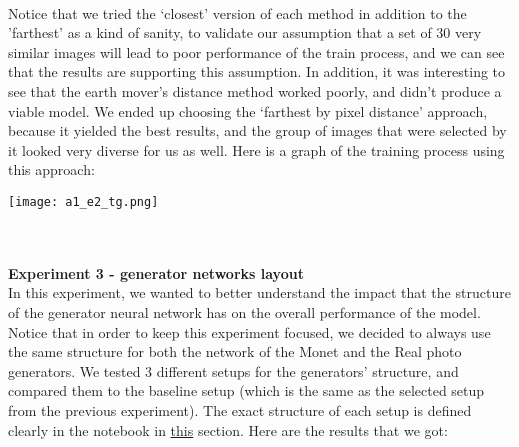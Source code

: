 \documentclass{article}
\begin{document}
\begin{table}[!ht]
    \centering
\end{table}
\\
Notice that we tried the ‘closest’ version of each method in addition to the ’farthest’ as a kind of sanity, to validate our assumption that a set of 30 very similar images will lead to poor performance of the train process, and we can see that the results are supporting this assumption. In addition, it was interesting to see that the earth mover’s distance method worked poorly, and didn’t produce a viable model.
We ended up choosing the ‘farthest by pixel distance’ approach, because it yielded the best results, and the group of images that were selected by it looked very diverse for us as well. Here is a graph of the training process using this approach:

\begin{center}
    \texttt{[image: a1\_e2\_tg.png]}
\end{center}
\\\\
\newblock
\textbf{Experiment 3 - generator networks layout}
\\
In this experiment, we wanted to better understand the impact that the structure of the generator neural network has on the overall performance of the model. Notice that in order to keep this experiment focused, we decided to always use the same structure for both the network of the Monet and the Real photo generators. We tested 3 different setups for the generators’ structure, and compared them to the baseline setup (which is the same as the selected setup from the previous experiment). The exact structure of each setup is defined clearly in the notebook in \href{https://colab.research.google.com/drive/1O95T3f5k68-do9Ml-EqE1FKqu67zdDw1#scrollTo=Build_generator_model}{this} section. Here are the results that we got:
\end{document}
